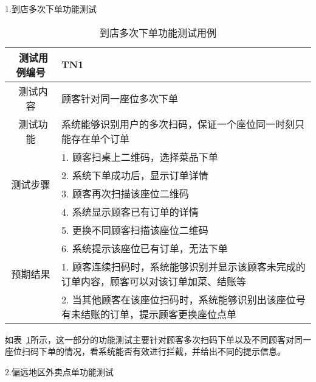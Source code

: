 1.到店多次下单功能测试
\begin{table}[htbp!]
    \footnotesize
    \centering
    \caption{到店多次下单功能测试用例}
    \vspace{2mm}
    \begin{tabular}{cp{11.5cm}}
     \hline
     \ 测试用例编号 & TN1 \\ 
     \hline
     \ 测试内容 & 顾客针对同一座位多次下单 \\ 
     \hline
     \ 测试功能 & 系统能够识别用户的多次扫码，保证一个座位同一时刻只能存在单个订单 \\ 
     \hline
     \multirow{4}{*}{测试步骤}
      & 1.	顾客扫桌上二维码，选择菜品下单\\
      & 2.	系统下单成功后，显示订单详情\\
      & 3.	顾客再次扫描该座位二维码\\
      & 4.	系统显示顾客已有订单的详情\\
      & 5.	更换不同顾客扫描该座位二维码\\
      & 6.	系统提示该座位已有订单，无法下单\\
     \hline
     \multirow{1}{*}{预期结果}
      & 1. 顾客连续扫码时，系统能够识别并显示该顾客未完成的订单内容，顾客可以对该订单加菜、结账等\\
      & 2. 当其他顾客在该座位扫码时，系统能够识别出该座位号有未结账的订单，提示顾客更换座位点单\\
    \hline
    \end{tabular}
    \label{table:tn1}
\end{table}

如表~\ref{table:tn1}所示，这一部分的功能测试主要针对顾客多次扫码下单以及不同顾客对同一座位扫码下单的情况，看系统能否有效进行拦截，并给出不同的提示信息。

2.偏远地区外卖点单功能测试

